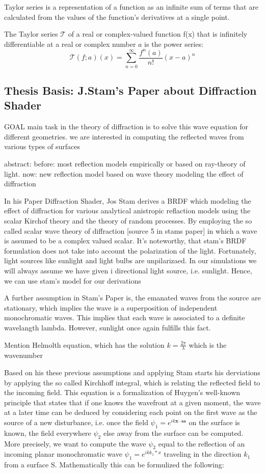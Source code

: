 Taylor series is a representation of a function as an infinite sum of terms that are calculated from the values of the function's derivatives at a single point.

The Taylor series $\mathcal T$ of a real or complex-valued function ƒ(x) that is infinitely differentiable at a real or complex number $a$ is the power series:
\begin{equation}
  \mathcal T(f;a)(x) = \sum_{n=0}^{\infty} \frac{f^{n}(a)}{n!}(x-a)^n
\end{equation}


\subsection{Thesis Basis: J.Stam's Paper about Diffraction Shader}
GOAL
main task in the theory of diffraction is to solve this wave equation for different geometries.
we are interested in computing the reflected waves from various types of surfaces

abstract:
before: most reflection models empirically or based on ray-theory of light.
now: new reflection model based on wave theory modeling the effect of diffraction


In his Paper Diffraction Shader, Jos Stam derives a BRDF which modeling the effect of diffraction for various analytical anistropic reflaction models using the scalar Kirchof theory and the theory of random processes. By employing the so called scalar wave theory of diffraction [source 5 in stams paper] in which a wave is assumed to be a complex valued scalar. It's noteworthy, that stam's BRDF formulation does not take into account the polarization of the light. Fortunately, light sources like sunlight and light bulbs are unpilarizaed. In our simulations we will always assume we have given i directional light source, i.e. sunlight. Hence, we can use stam's model for our derivations

A further assumption in Stam's Paper is, the emanated waves from the source are stationary, which implies the wave is a superposition of independent monochromatic waves. This implies that each wave is associated to a definite wavelangth lambda. However, sunlight once again fulfills this fact.

Mention Helmolth equation, which has the solution $k = \frac{2\pi}{\lambda}$ which is the wavenumber


Based on his these previous assumptions and applying Stam starts his derviations by applying the so called Kirchhoff integral, which is relating the reflected field to the incoming field. This equation is a formalization of Huygen’s well-known principle that states that if one knows the wavefront at a given moment, the wave at a later time can be deduced by considering each point on the first wave as the source of a new disturbance, i.e. once the field  $\psi_1 =  e^{ik\mathbf{x} \cdot \mathbf{s}\mathbf{s}}$ on the surface is known, the field everywhere $\psi_2$ else away from the surface can be computed.
More precisely, we want to compute the wave $\psi_2$ equal to the reflection of an incoming planar monochromatic wave $\psi_1 = e^{ik k_1 * x}$  traveling in the direction $k_1$ from a surface S. Mathematically this can be formulized the following:

